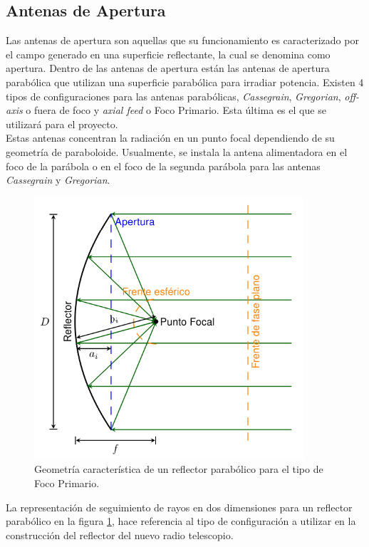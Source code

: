 \subsection{Antenas de Apertura}

Las antenas de apertura son aquellas que su funcionamiento es caracterizado por el campo generado en una superficie reflectante, la cual se denomina como apertura. Dentro de las antenas de apertura están las antenas de apertura parabólica que utilizan una superficie parabólica para irradiar potencia. Existen 4 tipos de configuraciones para las antenas parabólicas, \textit{Cassegrain}, \textit{Gregorian}, \textit{off-axis} o fuera de foco y \textit{axial feed} o Foco Primario. Esta última es el que se utilizará para el proyecto.\\

Estas antenas concentran la radiación en un punto focal dependiendo de su geometría de paraboloide. Usualmente, se instala la antena alimentadora en el foco de la parábola o en el foco de la segunda parábola para las antenas \textit{Cassegrain} y \textit{Gregorian}.\\

\begin{figure}
    \centering
    \includegraphics[width = 10cm]{img/parabola.png}
    \caption{Geometría característica de un reflector parabólico para el tipo de Foco Primario\cite{Astudillo2014}.}
    \label{fig:parabola}
\end{figure}

La representación de seguimiento de rayos en dos dimensiones para un reflector parabólico en la figura \ref{fig:parabola}, hace referencia al tipo de configuración a utilizar en la construcción del reflector del nuevo radio telescopio.


